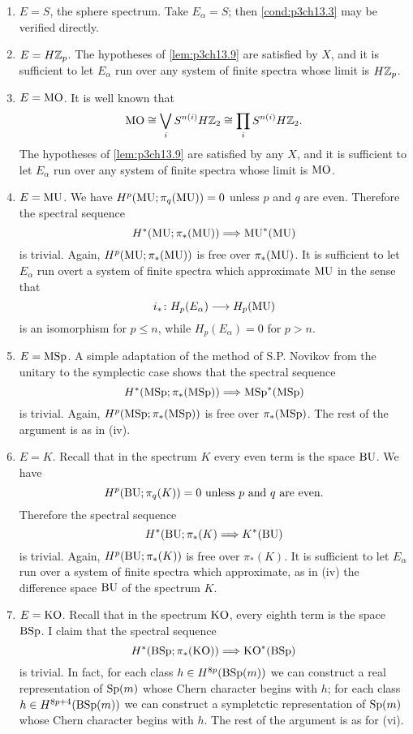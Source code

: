 \documentclass[../main]{subfiles}
\begin{document}
\begin{enumerate}[label=(\roman*)]
    \item $E=S$, the sphere spectrum. Take $E_\alpha = S$; then \ref{cond:p3ch13.3} may be verified directly.
    \item $E=H\mathbb{Z}_p$. The hypotheses of \ref{lem:p3ch13.9} are satisfied by $X$, and it is sufficient to let $E_\alpha$ run over any system of finite spectra whose limit is $H\mathbb{Z}_p$.
    \item $E=\mathrm{MO}$. It is well known that
    \[\mathrm{MO} \cong \bigvee_{i} S^{n(i)}H\mathbb{Z}_2 \cong \prod_i S^{n(i)} H\mathbb{Z}_2.\]
    The hypotheses of \ref{lem:p3ch13.9} are satisfied by any $X$, and it is sufficient to let $E_\alpha$ run over any system of finite spectra whose limit is $\mathrm{MO}$.
    \item $E = \mathrm{MU}$. We have $H^p(\mathrm{MU};\pi_q(\mathrm{MU})) = 0$ unless $p$ and $q$ are even. Therefore the spectral sequence
    \[H^{\ast}(\mathrm{MU};\pi_\ast(\mathrm{MU})) \Longrightarrow \mathrm{MU}^\ast(\mathrm{MU})\]
    is trivial. Again, $H^p(\mathrm{MU};\pi_\ast(\mathrm{MU}))$ is free over $\pi_\ast(\mathrm{MU})$. It is sufficient to let $E_\alpha$ run overt a system of finite spectra which approximate $\mathrm{MU}$ in the sense that
    \[i_\ast \colon H_p(E_\alpha) \longrightarrow H_p(\mathrm{MU})\]
    is an isomorphism for $p\leq n$, while $H_p(E_\alpha) = 0$ for $p > n$.
    \item $E=\mathrm{MSp}$. A simple adaptation of the method of S.P. Novikov \cite{novikov2} \cite{novikov3} from the unitary to the symplectic case shows that the spectral sequence
    \[H^{\ast}(\mathrm{MSp};\pi_{\ast}(\mathrm{MSp})) \Longrightarrow \mathrm{MSp}^\ast(\mathrm{MSp})\]
    is trivial. Again, $H^p(\mathrm{MSp};\pi_\ast(\mathrm{MSp}))$ is free over $\pi_\ast(\mathrm{MSp})$. The rest of the argument is as in (iv).
    \item $E=K$. Recall that in the spectrum $K$ every even term is the space $\mathrm{BU}$. We have
    \[H^p(\mathrm{BU};\pi_{q}(K)) = 0 \text{ unless } p \text{ and } q \text{ are even.}\]
    Therefore the spectral sequence
    \[H^{\ast}(\mathrm{BU};\pi_{\ast}(K) \Longrightarrow K^\ast(\mathrm{BU})\]
    is trivial. Again, $H^p(\mathrm{BU};\pi_\ast(K))$ is free over $\pi_\ast(K)$. It is sufficient to let $E_\alpha$ run over a system of finite spectra which approximate, as in (iv) the difference space $\mathrm{BU}$ of the spectrum $K$.
    \item $E = \mathrm{KO}$. Recall that in the spectrum $\mathrm{KO}$, every eighth term is the space $\mathrm{BSp}$. I claim that the spectral sequence
    \[H^{\ast}(\mathrm{BSp};\pi_\ast(\mathrm{KO})) \Longrightarrow \mathrm{KO}^\ast(\mathrm{BSp})\]
    is trivial. In fact, for each class $h \in H^{8p}(\mathrm{BSp}(m))$ we can construct a real representation of $\mathrm{Sp}(m)$ whose Chern character begins with $h$; for each class $h \in H^{8p+4}(\mathrm{BSp}(m))$ we can construct a sympletctic representation of $\mathrm{Sp}(m)$ whose Chern character begins with $h$. The rest of the argument is as for (vi).
\end{enumerate}
\end{document}
